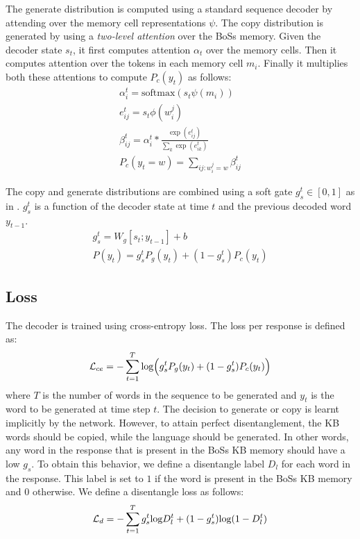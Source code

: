 The generate distribution is computed using a standard sequence decoder \cite{sutskever2014sequence} by attending \cite{luong2015effective} over the memory cell representations $\psi$. The copy distribution is generated by using a \textit{two-level attention} over the {\sc BoSs} memory. Given the decoder state $s_t$, it first computes attention $\alpha_t$ over the memory cells. Then it computes attention over the tokens in each memory cell $m_i$. Finally it multiplies both these attentions to compute $P_c(y_t)$ as follows: 
\begin{gather}
\alpha_i^t = \text{softmax}(s_t \psi(m_i)) \\
e_{ij}^t = s_t \phi(w_i^j) \\
\beta^{t}_{ij} = \alpha^t_i * \frac{\exp({e_{ij}^t})}{\sum\nolimits_{k}\exp({e_{ik}^t})} \\
P_c(y_t=w)=\sum_{ij:w_i^j=w} \beta_{ij}^{t}
\end{gather}


The copy and generate distributions are combined using a soft gate $g_s^t \in [0,1]$ as in \cite{see2017get}. $g_s^t$ is a function of the decoder state at time $t$ and the previous decoded word $y_{t-1}$.
\begin{gather}
g_s^t = W_g[s_t;y_{t-1}] + b \\
P(y_t) = g_s^{t}P_g(y_t) + (1-g_s^{t})P_c(y_t)
\end{gather}


\subsection{Loss}
The decoder is trained using cross-entropy loss. The loss per response is defined as:
\begin{equation}
\mathcal{L}_{ce} = - \sum_{t=1}^{T} \textup{log} \Big( g_s^{t}P_g(y_t) + (1-g_s^{t})P_c(y_t) \Big) 
\end{equation}
where $T$ is the number of words in the sequence to be generated and $y_t$ is the word to be generated at time step $t$. The decision to generate or copy is learnt implicitly by the network. However, to attain perfect disentanglement, the KB words should be copied, while the language should be generated. In other words, any word in the response that is present in the {\sc BoSs} KB memory should have a low $g_s$. To obtain this behavior, we define a disentangle label $D_{l}$ for each word in the response. This label is set to $1$ if the word is present in the {\sc BoSs} KB memory and $0$ otherwise.
We define a disentangle loss as follows:
\begin{equation}
\mathcal{L}_{d} = - \sum_{t=1}^{T} g_s^{t}\textup{log}D^{t}_{l} + (1-g_s^{t})\textup{log}(1-D^{t}_{l})
\end{equation}

